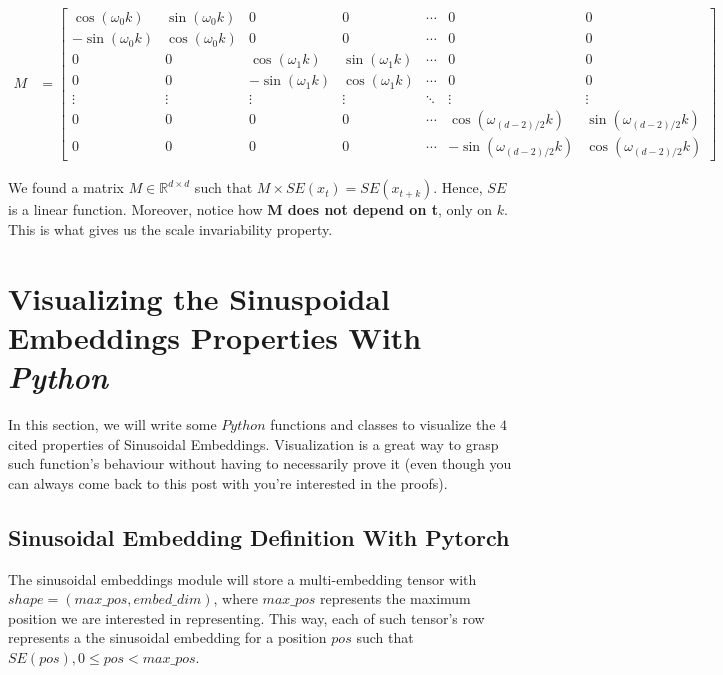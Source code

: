 \documentclass{article}
\begin{document}
\begin{align}
	M &=
	\begin{bmatrix}
		\cos(\omega_0 k) & \sin(\omega_0 k) & 0 & 0 & \cdots & 0 & 0 \\
		-\sin(\omega_0 k) & \cos(\omega_0 k) & 0 & 0 & \cdots & 0 & 0 \\
		0 & 0 & \cos(\omega_1 k) & \sin(\omega_1 k) & \cdots & 0 & 0 \\
		0 & 0 & -\sin(\omega_1 k) & \cos(\omega_1 k) & \cdots & 0 & 0 \\
		\vdots & \vdots & \vdots & \vdots & \ddots & \vdots & \vdots \\
		0 & 0 & 0 & 0 & \cdots & \cos(\omega_{(d-2)/2} k) & \sin(\omega_{(d-2)/2} k) \\
		0 & 0 & 0 & 0 & \cdots & -\sin(\omega_{(d-2)/2} k) & \cos(\omega_{(d-2)/2} k)
	\end{bmatrix}
\end{align}



We found a matrix $M \in \mathbb{R}^{d \times d}$ such that $M \times  SE(x_{t}) = SE(x_{t + k}) $. Hence, $SE$ is a linear function. Moreover, notice how \textbf{M does not depend on t}, only on $k$. This is what gives us the scale invariability property.

\section{Visualizing the Sinuspoidal Embeddings Properties With \textit{Python}}

In this section, we will write some $Python$ functions and classes to visualize the $4$ cited properties of Sinusoidal Embeddings. Visualization is a great way to grasp such function's behaviour without having to necessarily prove it (even though you can always come back to this post with you're interested in the proofs).

\subsection{Sinusoidal Embedding Definition With Pytorch}

The sinusoidal embeddings module will store a multi-embedding tensor with $shape =  (max\_pos, embed\_dim)$, where $max\_pos$ represents the maximum position we are interested in representing. This way, each of such tensor's row represents a the sinusoidal embedding for a position $pos$ such that $SE(pos), 0 \leq pos <  max\_pos $. 
\end{document}
